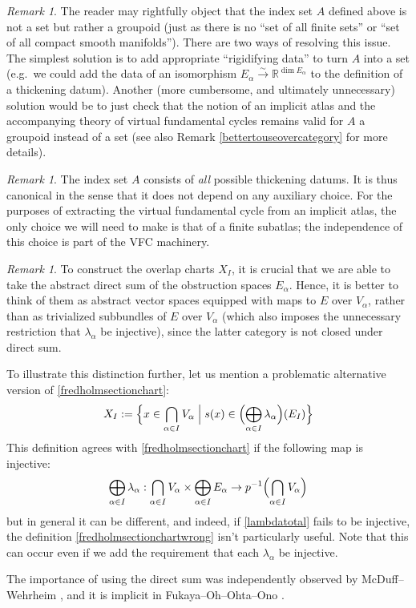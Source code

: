 \documentclass[12pt]{article}
\theoremstyle{definition}
\theoremstyle{remark}
\newtheorem{remark}[theorem]{Remark}
\numberwithin{equation}{subsection}
\newcommand{\RR}{\mathbb R}
\begin{document}
\begin{remark}\label{notsetremark}
The reader may rightfully object that the index set $A$ defined above is not a set but rather a groupoid (just as there is no ``set of all finite sets'' or ``set of all compact smooth manifolds'').  There are two ways of resolving this issue.  The simplest solution is to add appropriate ``rigidifying data'' to turn $A$ into a set (e.g.\ we could add the data of an isomorphism $E_\alpha\xrightarrow\sim\RR^{\dim E_\alpha}$ to the definition of a thickening datum).  Another (more cumbersome, and ultimately unnecessary) solution would be to just check that the notion of an implicit atlas and the accompanying theory of virtual fundamental cycles remains valid for $A$ a groupoid instead of a set (see also Remark \ref{bettertouseovercategory} for more details).
\end{remark}

\begin{remark}
The index set $A$ consists of \emph{all} possible thickening datums.  It is thus canonical in the sense that it does not depend on any auxiliary choice.  For the purposes of extracting the virtual fundamental cycle from an implicit atlas, the only choice we will need to make is that of a finite subatlas; the independence of this choice is part of the VFC machinery.
\end{remark}

\begin{remark}\label{directsumisbetter}
To construct the overlap charts $X_I$, it is crucial that we are able to take the abstract direct sum of the obstruction spaces $E_\alpha$.  Hence, it is better to think of them as abstract vector spaces equipped with maps to $E$ over $V_\alpha$, rather than as trivialized subbundles of $E$ over $V_\alpha$ (which also imposes the unnecessary restriction that $\lambda_\alpha$ be injective), since the latter category is not closed under direct sum.

To illustrate this distinction further, let us mention a problematic alternative version of \eqref{fredholmsectionchart}:
\begin{equation}\label{fredholmsectionchartwrong}
X_I:=\Bigl\{x\in\bigcap_{\alpha\in I}V_\alpha\Bigm|s(x)\in\Bigl(\bigoplus_{\alpha\in I}\lambda_\alpha\Bigr)(E_I)\Bigr\}
\end{equation}
This definition agrees with \eqref{fredholmsectionchart} if the following map is injective:
\begin{equation}\label{lambdatotal}
\bigoplus_{\alpha\in I}\lambda_\alpha:\bigcap_{\alpha\in I}V_\alpha\times\bigoplus_{\alpha\in I}E_\alpha\to p^{-1}\Bigl(\bigcap_{\alpha\in I}V_\alpha\Bigr)
\end{equation}
but in general it can be different, and indeed, if \eqref{lambdatotal} fails to be injective, the definition \eqref{fredholmsectionchartwrong} isn't particularly useful.  Note that this can occur even if we add the requirement that each $\lambda_\alpha$ be injective.

The importance of using the direct sum was independently observed by McDuff--Wehrheim \cite{mcduffwehrheim}, and it is implicit in Fukaya--Oh--Ohta--Ono \cite{foootechnicaldetails}.
\end{remark}
\end{document}
